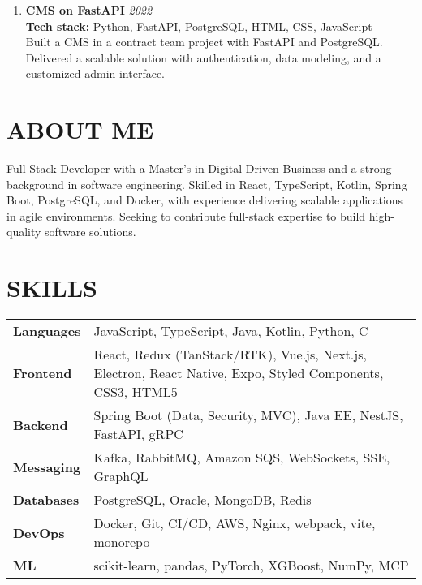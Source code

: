 \documentclass[11pt,a4paper]{moderncv}
\begin{document}
\begin{paracol}{2}
\begin{enumerate}[leftmargin=1em, itemsep=0.01em, labelsep=0.2em]
  \item \textbf{\color{darkblue} CMS on FastAPI} \hfill \textit{2022} \\
   {\scriptsize \textbf{Tech stack:} Python, FastAPI, PostgreSQL, HTML, CSS, JavaScript \\
  Built a CMS in a contract team project with FastAPI and PostgreSQL. Delivered a scalable solution with authentication, data modeling, and a customized admin interface.}

\end{enumerate}
  


\switchcolumn
\section{ABOUT ME}
\parbox{0.99\linewidth}{Full Stack Developer with a Master’s in Digital Driven Business and a strong background in software engineering. Skilled in React, TypeScript, Kotlin, Spring Boot, PostgreSQL, and Docker, with experience delivering scalable applications in agile environments. Seeking to contribute full-stack expertise to build high-quality software solutions.}
\section{SKILLS}
{\renewcommand{\arraystretch}{1.05}
\setlength{\tabcolsep}{4pt} %
\begin{tabularx}{\linewidth}{@{}>{\scriptsize\bfseries}l >{\scriptsize}X@{}}
Languages & JavaScript, TypeScript, Java, Kotlin, Python, C \\ [0.25em]
Frontend  & React, Redux (TanStack/RTK), Vue.js, Next.js, Electron, React Native, Expo, Styled Components, CSS3, HTML5 \\ [0.25em]
Backend   & Spring Boot (Data, Security, MVC), Java EE, NestJS, FastAPI, gRPC \\ [0.25em]
Messaging & Kafka, RabbitMQ, Amazon SQS, WebSockets, SSE, GraphQL \\ [0.25em]
Databases & PostgreSQL, Oracle, MongoDB, Redis\\ [0.25em]
DevOps    & Docker, Git, CI/CD, AWS, Nginx, webpack, vite, monorepo \\ [0.25em]
ML & scikit-learn, pandas, PyTorch, XGBoost, NumPy, MCP
\end{tabularx}
}
\vspace{-2mm}

\end{paracol}
\end{document}
